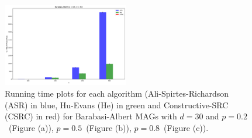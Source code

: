 \documentclass[a4paper]{article}
\begin{document}
\begin{figure}[htbp]
	\centering
	\hfill
	
	\includegraphics[width=0.49\textwidth]{figures/Figure_27.png}
	
	\caption{Running time plots for each algorithm (Ali-Spirtes-Richardson (ASR) in blue, Hu-Evans (He) in green and Constructive-SRC (CSRC) in red) for Barabasi-Albert MAGs with $d=30$ and $p=0.2$~(Figure (a)), $p=0.5$~(Figure (b)), $p=0.8$~(Figure (c)).}
	\label{fig:sf-30-ap}
\end{figure}
\end{document}
